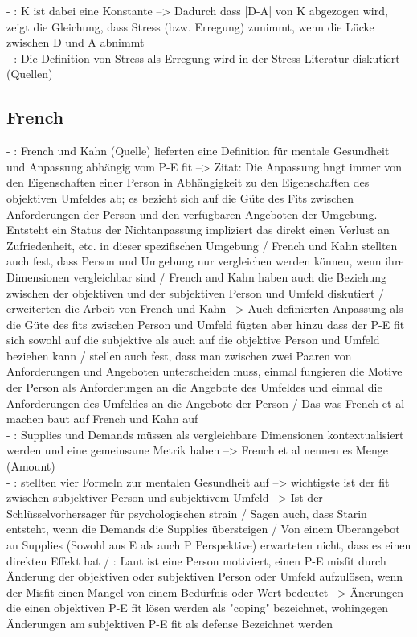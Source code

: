 - \cite[S. 17]{edwards:2008}: K ist dabei eine Konstante --> Dadurch dass |D-A| von K abgezogen wird, zeigt die Gleichung, dass Stress (bzw. Erregung) zunimmt, wenn die Lücke zwischen D und A abnimmt \\
- \cite[S. 18]{edwards:2008}: Die Definition von Stress als Erregung wird in der Stress-Literatur diskutiert (Quellen)

\subsection{French}
\label{ch:notizen:jobStress:french}
- \cite[S. 18]{edwards:2008}: French und Kahn (Quelle) lieferten eine Definition für mentale Gesundheit und Anpassung abhängig vom P-E fit --> Zitat: Die Anpassung hngt immer von den Eigenschaften einer Person in Abhängigkeit zu den Eigenschaften des objektiven Umfeldes ab; es bezieht sich auf die Güte des Fits zwischen Anforderungen der Person und den verfügbaren Angeboten der Umgebung. Entsteht ein Status der Nichtanpassung impliziert das direkt einen Verlust an Zufriedenheit, etc. in dieser spezifischen Umgebung / French und Kahn stellten auch fest, dass Person und Umgebung nur vergleichen werden können, wenn ihre Dimensionen vergleichbar sind  / French and Kahn haben auch die Beziehung zwischen der objektiven und der subjektiven Person und Umfeld diskutiert / \textcite{copingAndAdaption:1974} erweiterten die Arbeit von French und Kahn --> Auch \cite{copingAndAdaption:1974} definierten Anpassung als die Güte des fits zwischen Person und Umfeld fügten aber hinzu dass der P-E fit sich sowohl auf die subjektive als auch auf die objektive Person und Umfeld beziehen kann / \textcite{copingAndAdaption:1974} stellen auch fest, dass man zwischen zwei Paaren von Anforderungen und Angeboten unterscheiden muss, einmal fungieren die Motive der Person als Anforderungen an die Angebote des Umfeldes und einmal die Anforderungen des Umfeldes an die Angebote der Person / Das was French et al machen baut auf French und Kahn auf \\
- \cite[S. 18f.]{edwards:2008}: Supplies und Demands müssen als vergleichbare Dimensionen kontextualisiert werden und eine gemeinsame Metrik haben --> French et al nennen es Menge (Amount) \\
- \cite[S. 19]{edwards:2008}: \textcite{copingAndAdaption:1974} stellten vier Formeln zur mentalen Gesundheit auf --> wichtigste ist der fit zwischen subjektiver Person und subjektivem Umfeld --> Ist der Schlüsselvorhersager für psychologischen strain / Sagen auch, dass Starin entsteht, wenn die Demands die Supplies übersteigen / Von einem Überangebot an Supplies (Sowohl aus E als auch P Perspektive) erwarteten \cite[S. 319]{copingAndAdaption:1974} nicht, dass es einen direkten Effekt hat / \cite[S. 19f.]{edwards:2008}: Laut \textcite[S. 330f.]{copingAndAdaption:1974} ist eine Person motiviert, einen P-E misfit durch Änderung der objektiven oder subjektiven Person oder Umfeld aufzulösen, wenn der Misfit einen Mangel von einem Bedürfnis oder Wert bedeutet --> Änerungen die einen objektiven P-E fit lösen werden als "coping" bezeichnet, wohingegen Änderungen am subjektiven P-E fit als defense Bezeichnet werden \\
